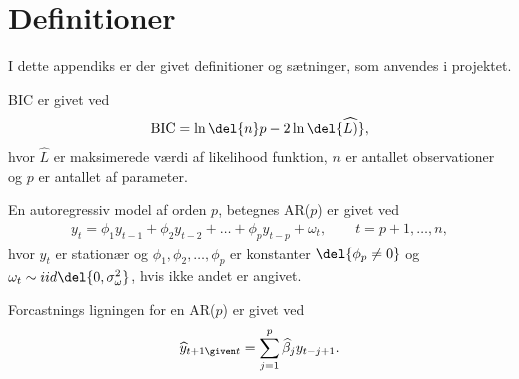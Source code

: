 \chapter{Definitioner} \label{app:def}
I dette appendiks er der givet definitioner og sætninger, som anvendes i projektet.

\begin{defn}\label{def:bic}
BIC er givet ved
\begin{align*}
\text{BIC} = \ln\del{n}p - 2 \ln\del{\widehat{L)}}, \label{eq:bic}
\end{align*}
hvor $\widehat{L}$ er maksimerede værdi af likelihood funktion, $n$ er antallet observationer og $p$ er antallet af parameter.
\end{defn} 

\begin{defn} \label{def:ar}
En autoregressiv model af orden $p$, betegnes AR($p$) er givet ved
\begin{align*}
y_t = \phi_1 y_{t-1} + \phi_2 y_{t-2} + \dots + \phi_p y_{t-p} + \omega_t, \qquad t = p+1, \dots, n,  
\end{align*}
hvor $y_t$ er stationær og $\phi_1 , \phi_2, \dots, \phi_p $ er konstanter  $\del{ \phi_p \neq 0}$ og $\omega_t \sim iid\del{0, \sigma_\omega^2}$, hvis ikke andet er angivet.  
\end{defn}
Forcastnings ligningen for en AR($p$) er givet ved 
\begin{equation}
\widehat{y}_{t+1 \given t} = \sum_{j = 1}^p \widehat{\beta}_j y_{t-j+1}.
\end{equation}

